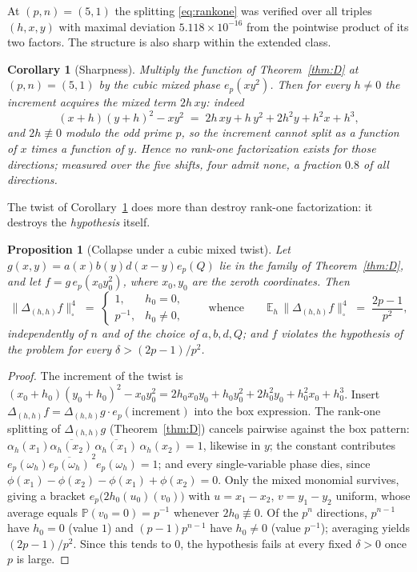\documentclass[11pt]{article}
\newtheorem{proposition}{Proposition}
\newtheorem{corollary}{Corollary}
\theoremstyle{remark}
\begin{document}
At $(p,n)=(5,1)$ the splitting \eqref{eq:rankone} was verified over all
triples $(h,x,y)$ with maximal deviation $5.118\times10^{-16}$ from the
pointwise product of its two factors. The structure is also sharp within the
extended class.

\begin{corollary}[Sharpness]\label{cor:sharp}
Multiply the function of Theorem~\ref{thm:D} at $(p,n)=(5,1)$ by the cubic
mixed phase $e_p(xy^{2})$. Then for every $h\ne0$ the increment acquires the
mixed term $2h\,xy$: indeed
\[
(x+h)(y+h)^2-xy^2\;=\;2h\,xy+h\,y^{2}+2h^{2}y+h^{2}x+h^{3},
\]
and $2h\not\equiv0$ modulo the odd prime $p$, so the increment cannot split
as a function of $x$ times a function of $y$. Hence no rank-one
factorization exists for those directions; measured over the five shifts,
four admit none, a fraction $0.8$ of all directions.
\end{corollary}

The twist of Corollary~\ref{cor:sharp} does more than destroy rank-one
factorization: it destroys the \emph{hypothesis} itself.

\begin{proposition}[Collapse under a cubic mixed twist]\label{prop:collapse}
Let $g(x,y)=a(x)b(y)d(x-y)e_p(Q)$ lie in the family of
Theorem~\ref{thm:D}, and let $f=g\,e_p(x_0y_0^{2})$, where $x_0,y_0$ are
the zeroth coordinates. Then
\begin{equation}\label{eq:collapse}
\bigl\|\Delta_{(h,h)}f\bigr\|_\square^4\;=\;
\begin{cases}
1, & h_0=0,\\[2pt]
p^{-1}, & h_0\neq0,
\end{cases}
\qquad\text{whence}\qquad
\mathbb{E}_h\,\bigl\|\Delta_{(h,h)}f\bigr\|_\square^4\;=\;\frac{2p-1}{p^{2}},
\end{equation}
independently of $n$ and of the choice of $a,b,d,Q$; and $f$ violates the
hypothesis of the problem for every $\delta>(2p-1)/p^{2}$.
\end{proposition}

\begin{proof}
The increment of the twist is
$(x_0+h_0)(y_0+h_0)^2-x_0y_0^2
=2h_0x_0y_0+h_0y_0^{2}+2h_0^{2}y_0+h_0^{2}x_0+h_0^{3}$.
Insert $\Delta_{(h,h)}f=\Delta_{(h,h)}g\cdot e_p(\text{increment})$ into the
box expression. The rank-one splitting of $\Delta_{(h,h)}g$
(Theorem~\ref{thm:D}) cancels pairwise against the box pattern:
$\alpha_h(x_1)\overline{\alpha_h(x_2)}\,\overline{\alpha_h(x_1)}\,
\alpha_h(x_2)=1$, likewise in $y$; the constant contributes
$e_p(\omega_h)\overline{e_p(\omega_h)}^{\,2}e_p(\omega_h)=1$; and every
single-variable phase dies, since $\phi(x_1)-\phi(x_2)-\phi(x_1)+\phi(x_2)=0$.
Only the mixed monomial survives, giving a bracket
$e_p\bigl(2h_0(u_0)(v_0)\bigr)$ with $u=x_1-x_2$, $v=y_1-y_2$ uniform, whose
average equals $\mathbb{P}(v_0=0)=p^{-1}$ whenever $2h_0\not\equiv0$. Of the
$p^{n}$ directions, $p^{n-1}$ have $h_0=0$ (value $1$) and $(p-1)p^{n-1}$
have $h_0\neq0$ (value $p^{-1}$); averaging yields $(2p-1)/p^{2}$. Since this
tends to $0$, the hypothesis fails at every fixed $\delta>0$ once $p$ is
large.
\end{proof}
\end{document}

